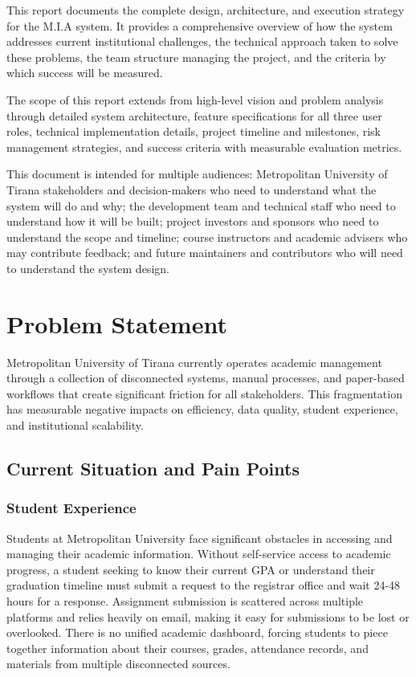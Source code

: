\documentclass[12pt,a4paper]{report}
\begin{document}
This report documents the complete design, architecture, and execution strategy for the M.I.A system. It provides a comprehensive overview of how the system addresses current institutional challenges, the technical approach taken to solve these problems, the team structure managing the project, and the criteria by which success will be measured.

The scope of this report extends from high-level vision and problem analysis through detailed system architecture, feature specifications for all three user roles, technical implementation details, project timeline and milestones, risk management strategies, and success criteria with measurable evaluation metrics.

This document is intended for multiple audiences: Metropolitan University of Tirana stakeholders and decision-makers who need to understand what the system will do and why; the development team and technical staff who need to understand how it will be built; project investors and sponsors who need to understand the scope and timeline; course instructors and academic advisers who may contribute feedback; and future maintainers and contributors who will need to understand the system design.

\chapter{Problem Statement}

Metropolitan University of Tirana currently operates academic management through a collection of disconnected systems, manual processes, and paper-based workflows that create significant friction for all stakeholders. This fragmentation has measurable negative impacts on efficiency, data quality, student experience, and institutional scalability.

\section{Current Situation and Pain Points}

\subsection{Student Experience}

Students at Metropolitan University face significant obstacles in accessing and managing their academic information. Without self-service access to academic progress, a student seeking to know their current GPA or understand their graduation timeline must submit a request to the registrar office and wait 24-48 hours for a response. Assignment submission is scattered across multiple platforms and relies heavily on email, making it easy for submissions to be lost or overlooked. There is no unified academic dashboard, forcing students to piece together information about their courses, grades, attendance records, and materials from multiple disconnected sources.
\end{document}
